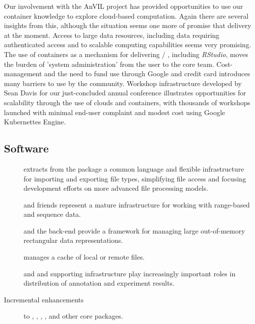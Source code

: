 \documentclass[letterpaper]{article}
\begin{document}
Our involvement with the AnVIL project has provided opportunities to
use our container knowledge to explore cloud-based computation. Again
there are several insights from this, although the situation seems one
more of promise that delivery at the moment. Access to large data
resources, including data requiring authenticated access and to
scalable computing capabilities seems very promising. The use of
containers as a mechanism for delivering \R{} / \Bioconductor{},
including \emph{RStudio}, moves the burden of 'system administration' from
the user to the \Bioconductor{} core team. Cost-management and the
need to fund use through Google and credit card introduces many
barriers to use by the \Bioconductor{} community. Workshop
infrastructure developed by Sean Davis for our just-concluded annual
conference illustrates opportunities for scalability through the use
of clouds and containers, with thousands of workshops launched with
minimal end-user complaint and modest cost using Google Kubernettes
Engine.

\subsection{Software}

\begin{description}
  \item[] extracts from the 
    package a common language and flexible infrastructure for
    importing and exporting file types, simplifying file access and
    focusing development efforts on more advanced file processing
    models.
\item[] and friends represent a mature infrastructure for
  working with range-based and sequence data.
\item[] and the  back-end
  provide a framework for managing large out-of-memory rectangular
  data representations.
\item[] manages a cache of local or remote files.
\item[] and  and
  supporting infrastructure play increasingly important roles in
  distribution of annotation and experiment results.
\item[Incremental enhancements] to ,
  , ,
  ,  and
  other core packages.
\end{description}
\end{document}
